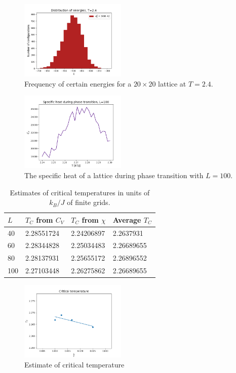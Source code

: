 \documentclass[notitlepage, reprint, nofootinbib]{revtex4-1}
\begin{document}
\begin{figure}%
	\centering 
	\includegraphics[width=0.45\textwidth]{../Figures/4d_histogram_T2.png}
	\caption{Frequency of certain energies for a $20\times20$ lattice at $T=2.4$.}
	\label{fig9}
\end{figure}

\begin{figure}%
	\centering 
	\includegraphics[width=0.45\textwidth]{../Figures/4e_L100_2.png}
	\caption{The specific heat of a lattice during phase transition with $L=100$.}
	\label{fig10}
\end{figure}

\begin{table}[] %
\centering
\begin{tabular}{|l|l|l|l|}
\hline
$L$ & $T_C$ from $C_V$ & $T_C$ from $\chi$ & Average $T_C$ \\ \hline
40 & 2.28551724 & 2.24206897 & 2.2637931 \\ \hline
60 & 2.28344828 & 2.25034483 & 2.26689655 \\ \hline
80 & 2.28137931 & 2.25655172 & 2.26896552 \\ \hline
100 & 2.27103448 & 2.26275862 & 2.26689655 \\ \hline
\end{tabular}
\caption{Estimates of critical temperatures in units of $k_B/J$ of finite grids.}
\label{T_C_table}
\end{table}

\begin{figure}%
	\centering 
	\includegraphics[width=0.45\textwidth]{../Figures/critical_temp.png}
	\caption{Estimate of critical temperature}
	\label{fig11}
\end{figure}
\end{document}
